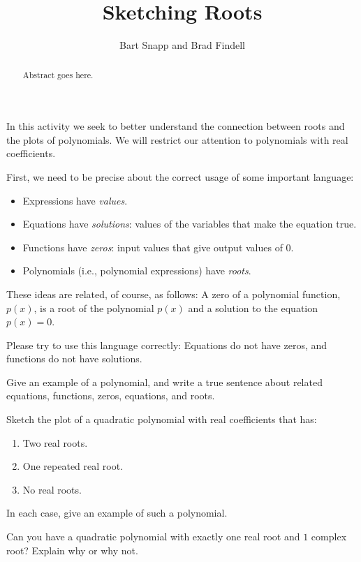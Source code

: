 \documentclass{ximera}
\title{Sketching Roots}
\author{Bart Snapp and Brad Findell}
\begin{document}
\begin{abstract}
Abstract goes here.  
\end{abstract}
\maketitle

\label{A:sketchRoots}

In this activity we seek to better understand the connection between
roots and the plots of polynomials.  We will restrict our attention to polynomials with real coefficients.  

First, we need to be precise about the correct usage of some important language:  

\begin{itemize}
\item Expressions have \emph{values}.  
\item Equations have \emph{solutions}:  values of the variables that make the equation true. 
\item Functions have \emph{zeros}: input values that give output values of 0.
\item Polynomials (i.e., polynomial expressions) have \emph{roots}.  
\end{itemize}
These ideas are related, of course, as follows:  A zero of a polynomial function, $p(x)$, is a root of the polynomial $p(x)$ and a solution to the equation $p(x) = 0$.  

Please try to use this language correctly:  Equations do not have zeros, and functions do not have solutions.  

\begin{problem}
Give an example of a polynomial, and write a true sentence about related equations, functions, zeros, equations, and roots.  
\end{problem}

\begin{problem}
Sketch the plot of a quadratic polynomial with real coefficients that has:
\begin{enumerate}
\item Two real roots.
\item One repeated real root.
\item No real roots.
\end{enumerate}
In each case, give an example of such a polynomial.
\end{problem}

\begin{problem}
Can you have a quadratic polynomial with exactly one real root and
$1$ complex root?  Explain why or why not.
\end{problem}
\end{document}
